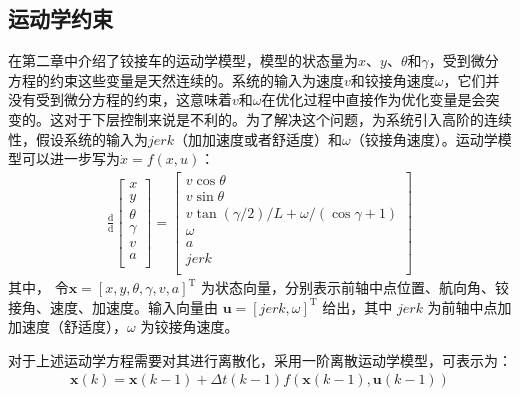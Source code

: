 \documentclass[master,academic]{ysuthesis} %
\begin{document}
		\subsection{运动学约束}
		在第二章中介绍了铰接车的运动学模型，模型的状态量为$x$、$y$、$\theta$和$\gamma$，受到微分方程的约束这些变量是天然连续的。系统的输入为速度$v$和铰接角速度$\omega$，它们并没有受到微分方程的约束，这意味着$v$和$\omega$在优化过程中直接作为优化变量是会突变的。这对于下层控制来说是不利的。为了解决这个问题，为系统引入高阶的连续性，假设系统的输入为$jerk$（加加速度或者舒适度）和$\omega$（铰接角速度）。运动学模型可以进一步写为$\dot{x}=f( x,u )$：
		\begin{equation}
			\begin{aligned}
				 \frac{\mathrm{d}}{\mathrm{d}}\left[ \begin{array}{c}
					x\\
					y\\
					\theta\\
					\gamma\\
					v\\
					a\\
				\end{array} \right] =\left[ \begin{array}{c}
					v\cos\theta\\
					v\sin\theta\\
					v\tan( \gamma /2 ) /L+\omega / (\cos\gamma +1 )\\
					\omega\\
					a\\
					jerk\\
				\end{array} \right] 
			\end{aligned}   
		\end{equation}
		其中， 令$\bm{x}=\left[ x,y,\theta,\gamma,v,a \right]^{\mathrm{T}}$ 为状态向量，分别表示前轴中点位置、航向角、铰接角、速度、加速度。输入向量由 $\bm{u}=\left[jerk,\omega\right]^{\mathrm{T}}$ 给出，其中 $jerk$ 为前轴中点加加速度（舒适度），$\omega$ 为铰接角速度。

		对于上述运动学方程需要对其进行离散化，采用一阶离散运动学模型，可表示为：
		\begin{equation}
			\begin{aligned}
				\bm{x}( k ) =\bm{x}( k-1 ) +\Delta t( k-1 ) f( \bm{x}( k-1 ) ,\bm{u}( k-1 ) ) 
			\end{aligned}   
		\end{equation}
\end{document}

